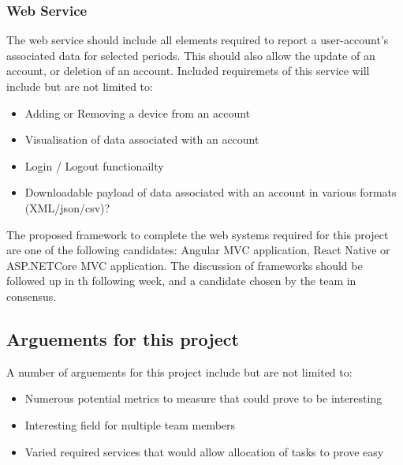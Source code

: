 \documentclass{article}
\begin{document}
            \subsubsection{Web Service}
            The web service should include all elements required to report a user-account's associated data
            for selected periods. This should also allow the update of an account, or deletion of an account.
            Included requiremets of this service will include but are not limited to:
            \begin{itemize}
                \item Adding or Removing a device from an account
                \item Visualisation of data associated with an account
                \item Login / Logout functionailty
                \item Downloadable payload of data associated with an account in various formats (XML/json/csv)?
            \end{itemize}
            \par
            The proposed framework to complete the web systems required for this project are one of the following 
            candidates: Angular MVC application\cite{Angular}, React Native\cite{ReactNative} or ASP.NETCore MVC 
            application\cite{ASP.NETcore-MVC}.
            The discussion of frameworks should be followed up in th following week, and a candidate chosen
            by the team in consensus.
            
            \subsection{Arguements for this project}
            A number of arguements for this project include but are not limited to:
            \begin{itemize}
                \item Numerous potential metrics to measure that could prove to be interesting
                \item Interesting field for multiple team members
                \item Varied required services that would allow allocation of tasks to prove easy
            \end{itemize}
\end{document}
